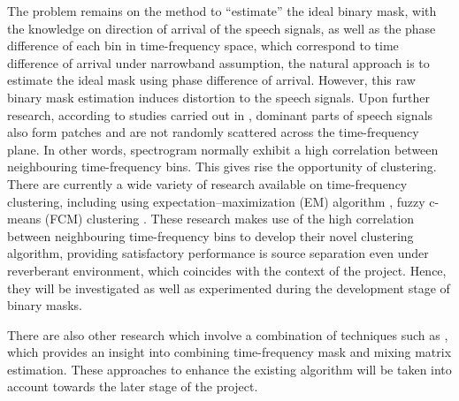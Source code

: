 \documentclass[a4paper,twoside,12pt,hidelinks]{article}
\begin{document}
The problem remains on the method to ``estimate'' the ideal binary mask, with the knowledge on direction of arrival of the speech signals, as well as the phase difference of each bin in time-frequency space, which correspond to time difference of arrival under narrowband assumption, the natural approach is to estimate the ideal mask using phase difference of arrival. However, this raw binary mask estimation induces distortion to the speech signals. \cite{Blin2005UnderdeterminedEstimation} Upon further research, according to studies carried out in \cite{Faller2004SourceCoherence}, dominant parts of speech signals also form patches and are not randomly scattered across the time-frequency plane. In other words, spectrogram normally exhibit a high correlation between neighbouring time-frequency bins. This gives rise the opportunity of clustering. There are currently a wide variety of research available on time-frequency clustering, including using expectation–maximization (EM) algorithm \cite{Sawada2011UnderdeterminedAlignment}, fuzzy c-means (FCM) clustering \cite{Jafari2014Time-frequencySeparation,Kuhne2010ASeparation}. These research makes use of the high correlation between neighbouring time-frequency bins to develop their novel clustering algorithm, providing satisfactory performance is source separation even under reverberant environment, which coincides with the context of the project. Hence, they will be investigated as well as experimented during the development stage of binary masks. 

There are also other research which involve a combination of techniques such as \cite{Blin2005UnderdeterminedEstimation}, which provides an insight into combining time-frequency mask and mixing matrix estimation. These approaches to enhance the existing algorithm will be taken into account towards the later stage of the project.
\end{document}
